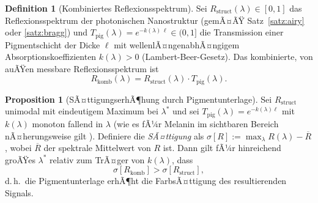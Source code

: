 ﻿\documentclass[a4paper,12pt]{article}
\theoremstyle{definition}
\newtheorem{definition}{Definition}
\newtheorem{proposition}{Proposition}
\begin{document}
\begin{definition}[Kombiniertes Reflexionsspektrum]
	\label{def:kombiniert}
	Sei $R_{\mathrm{struct}}(\lambda)\in[0,1]$ das Reflexionsspektrum der
	photonischen Nanostruktur (gemÃ¤ÃŸ Satz~\ref{satz:airy} oder
	\ref{satz:bragg}) und $T_{\mathrm{pig}}(\lambda) =
	e^{-k(\lambda)\,\ell}\in(0,1]$ die Transmission einer
	Pigmentschicht der Dicke $\ell$ mit wellenlÃ¤ngenabhÃ¤ngigem
	Absorptionskoeffizienten $k(\lambda)>0$ (Lambert-Beer-Gesetz).
	Das kombinierte, von auÃŸen messbare Reflexionsspektrum ist
	\[
	R_{\mathrm{komb}}(\lambda) = R_{\mathrm{struct}}(\lambda)\cdot
	T_{\mathrm{pig}}(\lambda).
	\]
\end{definition}

\begin{proposition}[SÃ¤ttigungserhÃ¶hung durch Pigmentunterlage]
	\label{prop:saettigung}
	Sei $R_{\mathrm{struct}}$ unimodal mit eindeutigem Maximum bei
	$\lambda^*$ und sei $T_{\mathrm{pig}}(\lambda) = e^{-k(\lambda)\ell}$
	mit $k(\lambda)$ monoton fallend in $\lambda$ (wie es fÃ¼r Melanin im
	sichtbaren Bereich nÃ¤herungsweise gilt \cite{vukusic2003photonic}).
	Definiere die \emph{SÃ¤ttigung} als
	$\sigma[R] := \max_\lambda R(\lambda) - \overline{R}$, wobei
	$\overline{R}$ der spektrale Mittelwert von $R$ ist.
	Dann gilt fÃ¼r hinreichend groÃŸes $\lambda^*$ relativ zum TrÃ¤ger von
	$k(\lambda)$, dass
	\[
	\sigma[R_{\mathrm{komb}}] > \sigma[R_{\mathrm{struct}}],
	\]
	d.\,h.\ die Pigmentunterlage erhÃ¶ht die FarbsÃ¤ttigung des
	resultierenden Signals.
\end{proposition}
\end{document}
